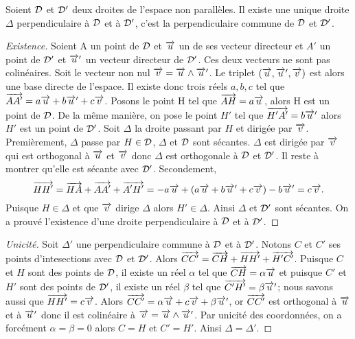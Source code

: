 \begin{theo}
  Soient \(\mathcal{D}\) et \(\mathcal{D}'\) deux droites de l'espace non parallèles. Il existe une unique droite \(\Delta\) perpendiculaire à \(\mathcal{D}\) et à \(\mathcal{D}'\), c'est la perpendiculaire commune de \(\mathcal{D}\) et \(\mathcal{D}'\).
\end{theo}
\begin{proof}[Existence]
  Soient A un point de \(\mathcal{D}\) et \(\overrightarrow{u}\) un de ses vecteur directeur et \(A'\) un point de \(\mathcal{D}'\) et \(\overrightarrow{u}'\) un vecteur directeur de \(\mathcal{D}'\). Ces deux vecteurs ne sont pas colinéaires. Soit le vecteur non nul \(\overrightarrow{v}=\overrightarrow{u}\wedge\overrightarrow{u}'\). Le triplet \((\overrightarrow{u},\overrightarrow{u}',\overrightarrow{v})\) est alors une base directe de l'espace. Il existe donc trois réels \(a,b,c\) tel que \(\overrightarrow{AA'}=a\overrightarrow{u}+b\overrightarrow{u}'+c\overrightarrow{v}\). Posons le point H tel que \(\overrightarrow{AH}=a\overrightarrow{u}\), alors H est un point de \(\mathcal{D}\). De la même manière, on pose le point \(H'\) tel que \(\overrightarrow{H'A'}=b\overrightarrow{u}'\) alors \(H'\) est un point de \(\mathcal{D}'\). Soit \(\Delta\) la droite passant par \(H\) et dirigée par \(\overrightarrow{v}\). Premièrement, \(\Delta\) passe par \(H\in\mathcal{D}\), \(\Delta\) et \(\mathcal{D}\) sont sécantes. \(\Delta\) est dirigée par \(\overrightarrow{v}\) qui est orthogonal à \(\overrightarrow{u}\) et \(\overrightarrow{v}\) donc \(\Delta\) est orthogonale à \(\mathcal{D}\) et \(\mathcal{D}'\). Il reste à montrer qu'elle est sécante avec \(\mathcal{D}'\). Secondement,
\begin{equation}
  \overrightarrow{HH'}=\overrightarrow{HA}+\overrightarrow{AA'}+\overrightarrow{A'H'}=-a\overrightarrow{u}+(a\overrightarrow{u}+b\overrightarrow{u}'+c\overrightarrow{v})-b\overrightarrow{u}'=c\overrightarrow{v}.
\end{equation}
Puisque \(H\in\Delta\) et que \(\overrightarrow{v}\) dirige \(\Delta\) alors \(H'\in\Delta\). Ainsi \(\Delta\) et \(\mathcal{D}'\) sont sécantes. On a prouvé l'existence d'une droite perpendiculaire à \(\mathcal{D}\) et à \(\mathcal{D}'\).
\end{proof}
\begin{proof}[Unicité]
  Soit \(\Delta'\) une perpendiculaire commune à \(\mathcal{D}\) et à \(\mathcal{D}'\). Notons \(C\) et \(C'\) ses points d'intesections avec \(\mathcal{D}\) et \(\mathcal{D}'\). Alors \(\overrightarrow{CC'}=\overrightarrow{CH}+\overrightarrow{HH'}+\overrightarrow{H'C'}\). Puisque \(C\) et \(H\) sont des points de \(\mathcal{D}\), il existe un réel \(\alpha\) tel que \(\overrightarrow{CH}=\alpha\overrightarrow{u}\) et puisque \(C'\) et \(H'\) sont des points de \(\mathcal{D}'\), il existe un réel \(\beta\) tel que \(\overrightarrow{C'H'}=\beta\overrightarrow{u}'\); nous savons aussi que \(\overrightarrow{HH'}=c\overrightarrow{v}\). Alors \(\overrightarrow{CC'}=\alpha\overrightarrow{u}+c\overrightarrow{v}+\beta\overrightarrow{u}'\), or \(\overrightarrow{CC'}\) est orthogonal à \(\overrightarrow{u}\) et à \(\overrightarrow{u}'\) donc il est colinéaire à \(\overrightarrow{v}=\overrightarrow{u}\wedge\overrightarrow{u}'\). Par unicité des coordonnées, on a forcément \(\alpha=\beta=0\) alors \(C=H\) et \(C'=H'\). Ainsi \(\Delta=\Delta'\).
\end{proof}

